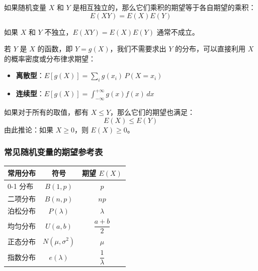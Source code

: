 \begin{theorem}[独立随机变量的乘积期望]
如果随机变量 $X$ 和 $Y$ 是相互独立的，那么它们乘积的期望等于各自期望的乘积：
\begin{equation}
	E(XY) = E(X)E(Y)
	\label{eq:第四章:乘积期望}
\end{equation}
\end{theorem}

\begin{warnbox}[警示]
如果 $X$ 和 $Y$ 不独立，$E(XY) = E(X)E(Y)$ 通常不成立。
\end{warnbox}

\begin{theorem}
若 $Y$ 是 $X$ 的函数，即 $Y = g(X)$，我们不需要求出 $Y$ 的分布，可以直接利用 $X$ 的概率密度或分布律求期望：
\begin{itemize}
	\item \textbf{离散型}：$E[g(X)] = \sum_{i} g(x_i)\,P(X = x_i)$
	\item \textbf{连续型}：$E[g(X)] = \int_{-\infty}^{+\infty} g(x) f(x)\,dx$
\end{itemize}
\end{theorem}

\begin{property}[期望的单调性]
如果对于所有的取值，都有 $X \le Y$，那么它们的期望也满足：
\begin{equation}
	E(X) \le E(Y)
	\label{eq:第四章:单调性}
\end{equation}
由此推论：如果 $X \ge 0$，则 $E(X) \ge 0$。
\end{property}

\subsubsection{常见随机变量的期望参考表}
\begin{table}[H]
\centering
\begin{tabular}{lcc}
\toprule
常用分布 & 符号 & 期望 $E(X)$ \\
\midrule
0-1 分布 & $B(1, p)$ & $p$ \\
二项分布 & $B(n, p)$ & $np$ \\
泊松分布 & $P(\lambda)$ & $\lambda$ \\
均匀分布 & $U(a, b)$ & $\dfrac{a+b}{2}$ \\
正态分布 & $N(\mu, \sigma^2)$ & $\mu$ \\
指数分布 & $e(\lambda)$ & $\dfrac{1}{\lambda}$ \\
\bottomrule
\end{tabular}
\end{table}

